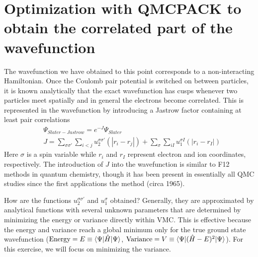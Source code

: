 \section{Optimization with QMCPACK to obtain the correlated part of the wavefunction}\label{sec:optimization_walkthrough}
The wavefunction we have obtained to this point corresponds to a non-interacting Hamiltonian.  Once the Coulomb pair potential is switched on between particles, it is known analytically that the exact wavefunction has cusps whenever two particles meet spatially and in general the electrons become correlated.  This is represented in the wavefunction by introducing a Jastrow factor containing at least pair correlations
\begin{align}
  &\Psi_{Slater-Jastrow}=e^{-J}\Psi_{Slater} \\
  &J = \sum_{\sigma\sigma'}\sum_{i<j}u^{\sigma\sigma'}_2(|r_i-r_j|) + \sum_\sigma\sum_{iI}u^{\sigma I}_1(|r_i-r_I|)
\end{align}
Here $\sigma$ is a spin variable while $r_i$ and $r_I$ represent electron and ion coordinates, respectively.  The introduction of $J$ into the wavefunction is similar to F12 methods in quantum chemistry, though it has been present in essentially all QMC studies since the first applications the method (circa 1965).

How are the functions $u_2^{\sigma\sigma'}$ and $u_1^{\sigma}$ obtained?  Generally, they are approximated by analytical functions with several unknown parameters that are determined by minimizing the energy or variance directly within VMC.  This is effective because the energy and variance reach a global minimum only for the true ground state wavefunction ($\textrm{Energy}=E\equiv\expval{\Psi}{\hat{H}}{\Psi}$, $\textrm{Variance}=V\equiv\expval{\Psi}{(\hat{H}-E)^2}{\Psi}$).  For this exercise, we will focus on minimizing the variance.

